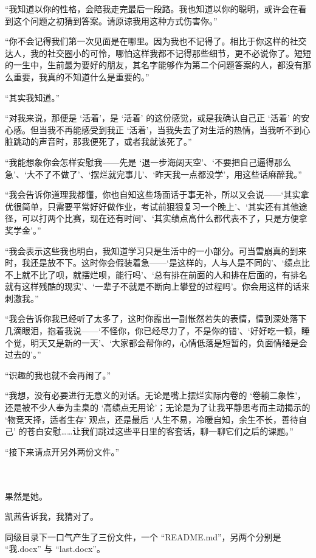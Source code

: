 \documentclass[UTF8]{ctexart}
\begin{document}
“我知道以你的性格，会陪我走完最后一段路。我也知道以你的聪明，或许会在看到这个问题之初猜到答案。请原谅我用这种方式伤害你。”

“你不会记得我们第一次见面是在哪里。因为我也不记得了。相比于你这样的社交达人，我的社交圈小的可怜，哪怕这样我都不记得那些细节，更不必说你了。短短的一生中，生前最为要好的朋友，其名字能够作为第二个问题答案的人，都没有那么重要，我真的不知道什么是重要的。”

“其实我知道。”

“对我来说，那便是 ‘活着’，是 ‘活着’ 的这份感觉，或是我确认自己正 ‘活着’ 的安心感。但当我不再能感受到我正 ‘活着’，当我失去了对生活的热情，当我听不到心脏跳动的声音时，那我便死了，或者我就该死了。”

“我能想象你会怎样安慰我——先是 ‘退一步海阔天空’、‘不要把自己逼得那么急’、‘大不了不做了’、‘摆烂就完事儿’、‘昨天我一点都没学’，用这些话麻醉我。”

“我会告诉你道理我都懂，你也自知这些场面话于事无补，所以又会说——‘其实拿优很简单，只需要平常好好做作业，考试前狠狠复习一个晚上’、‘其实还有其他途径，可以打两个比赛，现在还有时间’、‘其实绩点高什么都代表不了，只是方便拿奖学金’。”

“我会表示这些我也明白，我知道学习只是生活中的一小部分。可当雪崩真的到来时，我还是放不下。这时你会假装着急——‘是这样的，人与人是不同的’、‘绩点比不上就不比了呗，就摆烂呗，能行吗’、‘总有排在前面的人和排在后面的，有排名就有这样残酷的现实’、‘一辈子不就是不断向上攀登的过程吗’。你会用这样的话来刺激我。”

“我会告诉你我已经听了太多了，这时你露出一副怅然若失的表情，情到深处落下几滴眼泪，抱着我说——‘不怪你，你已经尽力了，不是你的错’、‘好好吃一顿，睡个觉，明天又是新的一天’、‘大家都会帮你的，心情低落是短暂的，负面情绪是会过去的’。”

“识趣的我也就不会再闹了。”

“我想，没有必要进行无意义的对话。无论是嘴上摆烂实际内卷的 ‘卷躺二象性’，还是被不少人奉为圭臬的 ‘高绩点无用论’；无论是为了让我平静思考而主动揭示的 ‘物竞天择，适者生存’ 观点，还是最后 ‘人生不易，冷暖自知，余生不长，善待自己’ 的苍白安慰……让我们跳过这些平日里的客套话，聊一聊它们之后的课题。”

“接下来请点开另外两份文件。”

~\\
~\\

果然是她。

凯茜告诉我，我猜对了。

同级目录下一口气产生了三份文件，一个 “README.md”，另两个分别是 “我.docx” 与 “last.docx”。
\end{document}
